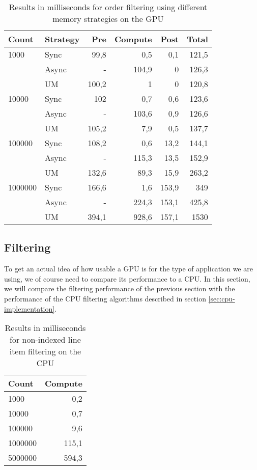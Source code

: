 \documentclass[a4paper,titlepage]{article}
\begin{document}
\begin{table}
\begin{tabular}{l l r r r r}
\toprule
\textbf{Count} & \textbf{Strategy} &\textbf{Pre} & \textbf{Compute} & \textbf{Post} & \textbf{Total}\\
\midrule
1000    & Sync  &  99,8  & 0,5   & 0,1   & 121,5 \\
        & Async &  -     & 104,9 & 0     & 126,3 \\
        & UM    &  100,2 & 1     & 0     & 120,8 \\
10000   & Sync  &  102   & 0,7   & 0,6   & 123,6 \\
        & Async &  -     & 103,6 & 0,9   & 126,6 \\
        & UM    &  105,2 & 7,9   & 0,5   & 137,7 \\
100000  & Sync  &  108,2 & 0,6   & 13,2  & 144,1 \\
        & Async &  -     & 115,3 & 13,5  & 152,9 \\
        & UM    &  132,6 & 89,3  & 15,9  & 263,2 \\
1000000 & Sync  &  166,6 & 1,6   & 153,9 & 349 \\
        & Async &  -     & 224,3 & 153,1 & 425,8 \\
        & UM    &  394,1 & 928,6 & 157,1 & 1530 \\
\bottomrule
\end{tabular}
\label{tbl:order-strategies}
\caption{Results in milliseconds for order filtering using different memory strategies on the GPU}
\end{table}

\subsection{Filtering}
To get an actual idea of how usable a GPU is for the type of application we are using, we of course need to compare its performance to a CPU. In this section, we will compare the filtering performance of the previous section with the performance of the CPU filtering algorithms described in section \ref{sec:cpu-implementation}.

\begin{table}
\begin{tabular}{l r}
\toprule
\textbf{Count} & \textbf{Compute}\\
\midrule
1000    & 0,2 \\
10000   & 0,7 \\
100000  & 9,6 \\
1000000 & 115,1 \\
5000000 & 594,3 \\
\bottomrule
\end{tabular}
\label{tbl:line-items-cpu}
\caption{Results in milliseconds for non-indexed line item filtering on the CPU}
\end{table}
\end{document}
